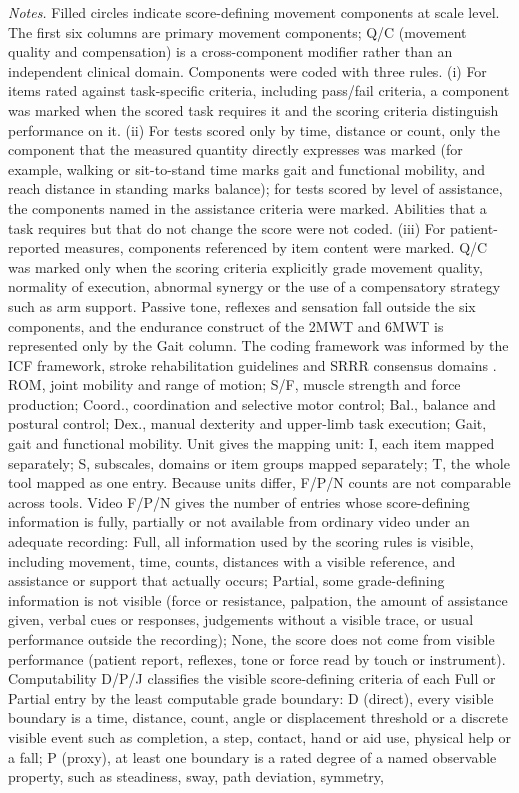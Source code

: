 \noindent\scriptsize\textit{Notes.} Filled circles indicate score-defining movement components at scale level. The first six columns are primary movement components; Q/C (movement quality and compensation) is a cross-component modifier rather than an independent clinical domain. Components were coded with three rules. (i) For items rated against task-specific criteria, including pass/fail criteria, a component was marked when the scored task requires it and the scoring criteria distinguish performance on it. (ii) For tests scored only by time, distance or count, only the component that the measured quantity directly expresses was marked (for example, walking or sit-to-stand time marks gait and functional mobility, and reach distance in standing marks balance); for tests scored by level of assistance, the components named in the assistance criteria were marked. Abilities that a task requires but that do not change the score were not coded. (iii) For patient-reported measures, components referenced by item content were marked. Q/C was marked only when the scoring criteria explicitly grade movement quality, normality of execution, abnormal synergy or the use of a compensatory strategy such as arm support. Passive tone, reflexes and sensation fall outside the six components, and the endurance construct of the 2MWT and 6MWT is represented only by the Gait column. The coding framework was informed by the ICF framework, stroke rehabilitation guidelines and SRRR consensus domains \cite{WHO2001ICF,S1Winstein2016AHAASARehab,S1VADoD2024StrokeRehab,S1NICE2023NG236,CoreKwakkel2017SRRRSensorimotor,CoreKwakkel2019SRRRUpperLimb,CoreVanCriekinge2024SRRRBalanceMobility}. ROM, joint mobility and range of motion; S/F, muscle strength and force production; Coord., coordination and selective motor control; Bal., balance and postural control; Dex., manual dexterity and upper-limb task execution; Gait, gait and functional mobility. Unit gives the mapping unit: I, each item mapped separately; S, subscales, domains or item groups mapped separately; T, the whole tool mapped as one entry. Because units differ, F/P/N counts are not comparable across tools. Video F/P/N gives the number of entries whose score-defining information is fully, partially or not available from ordinary video under an adequate recording: Full, all information used by the scoring rules is visible, including movement, time, counts, distances with a visible reference, and assistance or support that actually occurs; Partial, some grade-defining information is not visible (force or resistance, palpation, the amount of assistance given, verbal cues or responses, judgements without a visible trace, or usual performance outside the recording); None, the score does not come from visible performance (patient report, reflexes, tone or force read by touch or instrument). Computability D/P/J classifies the visible score-defining criteria of each Full or Partial entry by the least computable grade boundary: D (direct), every visible boundary is a time, distance, count, angle or displacement threshold or a discrete visible event such as completion, a step, contact, hand or aid use, physical help or a fall; P (proxy), at least one boundary is a rated degree of a named observable property, such as steadiness, sway, path deviation, symmetry, 